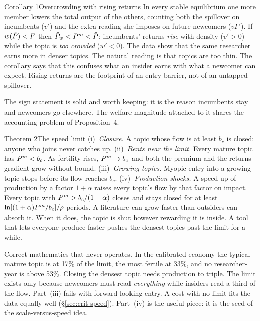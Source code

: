 \begin{resultbox}{Corollary 1}{Overcrowding with rising returns}{\tsolid}
In every stable equilibrium one more member lowers the total output of the others, counting both the spillover on incumbents ($v'$) and the extra reading she imposes on future newcomers ($v\Gamma'$). If $w(\hat P)<F$ then $\hat P_w<P^{m}<\hat P$: incumbents' returns \emph{rise} with density ($v'>0$) while the topic is \emph{too crowded} ($w'<0$).
\tcblower
\inwords The data show that the same researcher earns more in denser topics. The natural reading is that topics are too thin. The corollary says that this confuses what an insider earns with what a newcomer can expect. Rising returns are the footprint of an entry barrier, not of an untapped spillover.

\review The sign statement is solid and worth keeping: it is the reason incumbents stay and newcomers go elsewhere. The welfare magnitude attached to it shares the accounting problem of Proposition~4.
\end{resultbox}

\begin{resultbox}{Theorem 2}{The speed limit}{\tinert}
(i)~\emph{Closure.} A topic whose flow is at least $b_c$ is closed: anyone who joins never catches up.
(ii)~\emph{Rents near the limit.} Every mature topic has $P^{m}<b_c$. As fertility rises, $P^{m}\to b_c$ and both the premium and the returns gradient grow without bound.
(iii)~\emph{Growing topics.} Myopic entry into a growing topic stops before its flow reaches $b_c$.
(iv)~\emph{Production shocks.} A speed-up of production by a factor $1+\alpha$ raises every topic's flow by that factor on impact. Every topic with $P^{m}>b_c/(1+\alpha)$ closes and stays closed for at least $\ln[(1+\alpha)P^{m}/b_c]/\rho$ periods.
\tcblower
\inwords A literature can grow faster than outsiders can absorb it. When it does, the topic is shut however rewarding it is inside. A tool that lets everyone produce faster pushes the densest topics past the limit for a while.

\review Correct mathematics that never operates. In the calibrated economy the typical mature topic is at 17\% of the limit, the most fertile at 33\%, and no researcher-year is above 53\%. Closing the densest topic needs production to triple. The limit exists only because newcomers must read \emph{everything} while insiders read a third of the flow. Part~(iii) fails with forward-looking entry. A cost with no limit fits the data equally well (\S\ref{sec:crit-speed}). Part~(iv) is the useful piece: it is the seed of the scale-versus-speed idea.
\end{resultbox}

